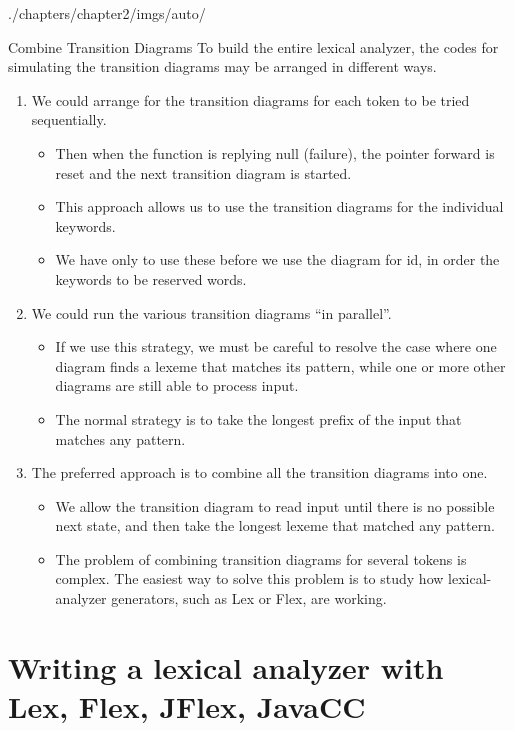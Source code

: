 \begin{graphicspathcontext}{{./chapters/chapter2/imgs/auto/}}
\begin{bibunit}[apalike]
\begin{frame}{Combine Transition Diagrams}
	To build the entire lexical analyzer, the codes for simulating the transition diagrams may be arranged in different ways.
	\begin{enumerate}
	\item We could arrange for the transition diagrams for each token to be tried sequentially.
		\begin{itemize}
		\item Then when the function is replying null (failure), the pointer forward is reset and the next transition diagram is started.
		\item This approach allows us to use the transition diagrams for the individual keywords.
		\item We have only to use these before we use the diagram for id, in order the keywords to be reserved words.
		\end{itemize}
	\item We could run the various transition diagrams ``in parallel''.
		\begin{itemize}
		\item If we use this strategy, we must be careful to resolve the case where one diagram finds a lexeme that matches its pattern, while one or more other diagrams are still able to process input.
		\item The normal strategy is to take the longest prefix of the input that matches any pattern.
		\end{itemize}
	\item The preferred approach is to combine all the transition diagrams into one.
		\begin{itemize}
		\item We allow the transition diagram to read input until there is no possible next state, and then take the longest lexeme that matched any pattern.
		\item The problem of combining transition diagrams for several tokens is complex. The easiest way to solve this problem is to study how lexical-analyzer generators, such as Lex or Flex, are working.	
		\end{itemize}
	\end{enumerate}
\end{frame}

\section[Generators of lexical analyser]{Writing a lexical analyzer with Lex, Flex, JFlex, JavaCC}


\end{bibunit}
\end{graphicspathcontext}
